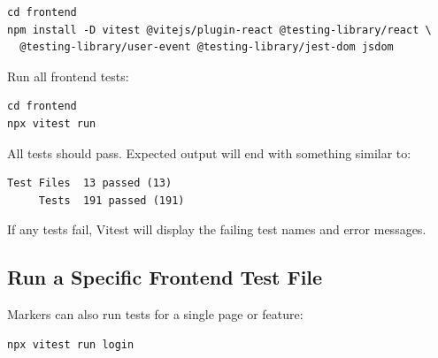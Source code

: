 \documentclass[12pt]{article}
\begin{document}
\begin{lstlisting}
cd frontend
npm install -D vitest @vitejs/plugin-react @testing-library/react \
  @testing-library/user-event @testing-library/jest-dom jsdom
\end{lstlisting}

Run all frontend tests:

\begin{lstlisting}
cd frontend
npx vitest run
\end{lstlisting}

All tests should pass. Expected output will end with something similar to:

\begin{lstlisting}
Test Files  13 passed (13)
     Tests  191 passed (191)
\end{lstlisting}

If any tests fail, Vitest will display the failing test names and error messages.

\subsection{Run a Specific Frontend Test File}

Markers can also run tests for a single page or feature:

\begin{lstlisting}
npx vitest run login
\end{lstlisting}
\end{document}
